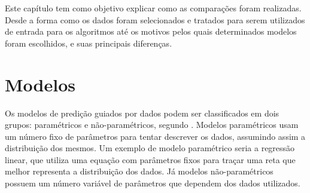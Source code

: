

Este capítulo tem como objetivo explicar como as comparações foram realizadas. Desde a forma como os dados foram selecionados e tratados para serem utilizados de entrada para os algoritmos até os motivos pelos quais determinados modelos foram escolhidos, e suas principais diferenças.



\section{Modelos}


Os modelos de predição guiados por dados podem ser classificados em dois grupos: paramétricos e não-paramétricos, segundo \cite{parametric}. Modelos paramétricos usam um número fixo de parâmetros para tentar descrever os dados, assumindo assim a distribuição dos mesmos. Um exemplo de modelo paramétrico seria a regressão linear, que utiliza uma equação com parâmetros fixos para traçar uma reta que melhor representa a distribuição dos dados. Já modelos não-paramétricos possuem um número variável de parâmetros que dependem dos dados utilizados.

